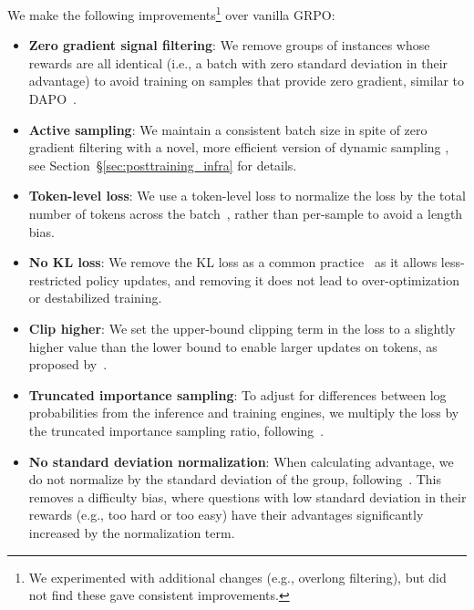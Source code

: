 \documentclass[table]{ai2style/ai2}
\begin{document}
We make the following improvements\footnote{We experimented with additional changes (e.g., overlong filtering), but did not find these gave consistent improvements.} over vanilla GRPO:
\begin{itemize}
    \item {\bf{Zero gradient signal filtering}}: We remove groups of instances whose rewards are all identical (i.e., a batch with zero standard deviation in their advantage) to avoid training on samples that provide zero gradient, similar to DAPO~\citep{yu2025dapo}.
    \item {\bf{Active sampling}}: We maintain a consistent batch size in spite of zero gradient filtering with a novel, more efficient version of dynamic sampling \citep{yu2025dapo}, see 
    Section~\S\ref{sec:posttraining_infra} for details.
    \item {\bf{Token-level loss}}: We use a token-level loss to normalize the loss by the total number of tokens across the batch~\citep{yu2025dapo}, rather than per-sample to avoid a length bias.
    \item {\bf{No KL loss}}: We remove the KL loss as a common practice~\citep{glm45,yu2025dapo,liu2025understanding} as it allows less-restricted policy updates, and removing it does not lead to over-optimization or destabilized training.
    \item {\bf{Clip higher}}: We set the upper-bound clipping term in the loss to a slightly higher value than the lower bound to enable larger updates on tokens, as proposed by~\citet{yu2025dapo}.
      \item {\bf{Truncated importance sampling}}: To adjust for differences between log probabilities from the inference and training engines, we multiply the loss by the truncated importance sampling ratio, following~\citet{yao2025offpolicy}.
     \item {\bf{No standard deviation normalization}}: When calculating advantage, we do not normalize by the standard deviation of the group, following~\citet{liu2025understanding}.
     This removes a difficulty bias, where questions with low standard deviation in their rewards (e.g., too hard or too easy) have their advantages significantly increased by the normalization term.
\end{itemize}
\end{document}
